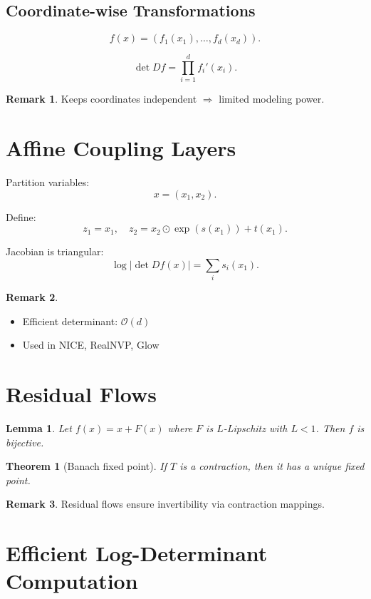 \documentclass[12pt,oneside]{book}
\numberwithin{equation}{section}
\theoremstyle{definition}
\newtheorem{remark}{Remark}[section]
\theoremstyle{plain}
\newtheorem{theorem}{Theorem}[section]
\newtheorem{lemma}{Lemma}[section]
\theoremstyle{remark}
\begin{document}
\subsection{Coordinate-wise Transformations}

\[
f(x) = (f_1(x_1), \dots, f_d(x_d)).
\]

\[
\det Df = \prod_{i=1}^d f_i'(x_i).
\]

\begin{remark}
Keeps coordinates independent $\Rightarrow$ limited modeling power.
\end{remark}

\section{Affine Coupling Layers}

Partition variables:
\[
x = (x_1, x_2).
\]

Define:
\[
z_1 = x_1, \quad
z_2 = x_2 \odot \exp(s(x_1)) + t(x_1).
\]

Jacobian is triangular:
\[
\log |\det Df(x)| = \sum_i s_i(x_1).
\]

\begin{remark}
\begin{itemize}
    \item Efficient determinant: $\mathcal{O}(d)$
    \item Used in NICE, RealNVP, Glow
\end{itemize}
\end{remark}

\section{Residual Flows}

\begin{lemma}
Let $f(x) = x + F(x)$ where $F$ is $L$-Lipschitz with $L < 1$. Then $f$ is bijective.
\end{lemma}

\begin{theorem}[Banach fixed point]
If $T$ is a contraction, then it has a unique fixed point.
\end{theorem}

\begin{remark}
Residual flows ensure invertibility via contraction mappings.
\end{remark}

\section{Efficient Log-Determinant Computation}
\end{document}
